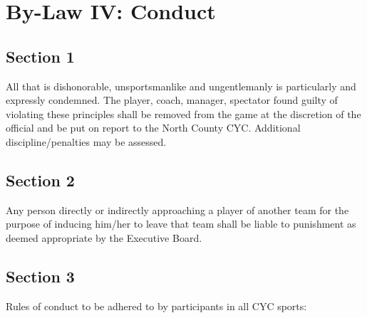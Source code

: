 \section{By-Law IV: Conduct}
\label{sec:bylaw-4}
\subsection{Section 1}
\label{ssec:bylaw-4-1}
All that is dishonorable, unsportsmanlike and ungentlemanly is particularly and expressly condemned.  The player, coach, manager, spectator found guilty of violating these principles shall be removed from the game at the discretion of the official and be put on report to the North County CYC.  Additional discipline/penalties may be assessed.

\subsection{Section 2}
\label{ssec:bylaw-4-2}
Any person directly or indirectly approaching a player of another team for the purpose of inducing him/her to leave that team shall be liable to punishment as deemed appropriate by the Executive Board.

\subsection{Section 3}
\label{ssec:bylaw-4-3}
Rules of conduct to be adhered to by participants in all CYC sports:

